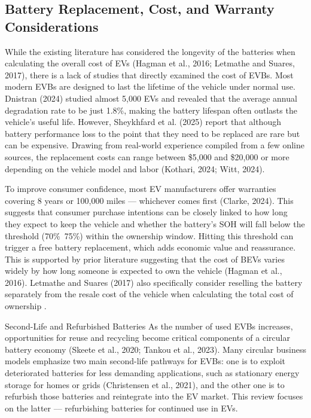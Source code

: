 \documentclass[a4paper,fleqn]{cas-sc}   %
\begin{document}
\subsection{Battery Replacement, Cost, and Warranty Considerations}
While the existing literature has considered the longevity of the batteries when calculating the overall cost of EVs (Hagman et al., 2016; Letmathe and Suares, 2017), there is a lack of studies that directly examined the cost of EVBs.
Most modern EVBs are designed to last the lifetime of the vehicle under normal use. Dnistran (2024) studied almost 5,000 EVs and revealed that the average annual degradation rate to be just 1.8\%, making the battery lifespan often outlasts the vehicle’s  useful life. However, Sheykhfard et al. (2025) report that although battery performance loss to the point that they need to be replaced are rare but can be expensive. Drawing from real-world experience compiled from a few online sources, the replacement costs can range between \$5,000 and \$20,000 or more depending on the vehicle model and labor (Kothari, 2024; Witt, 2024).

To improve consumer confidence, most EV manufacturers offer warranties covering 8 years or 100,000 miles –-- whichever comes first (Clarke, 2024). This suggests that consumer purchase intentions can be closely linked to how long they expect to keep the vehicle and whether the battery's SOH will fall below the threshold (70\%~75\%) within the ownership window. Hitting this threshold can trigger a free battery replacement, which adds economic value and reassurance. This is supported by prior literature suggesting that the cost of BEVs varies widely by how long someone is expected to own the vehicle (Hagman et al., 2016). Letmathe and Suares (2017) also specifically consider reselling the battery separately from the resale cost of the vehicle when calculating the total cost of ownership .

Second-Life and Refurbished Batteries
As the number of used EVBs increases, opportunities for reuse and recycling become critical components of a circular battery economy (Skeete et al., 2020; Tankou et al., 2023). Many circular business models emphasize two main second-life pathways for EVBs: one is to exploit deteriorated batteries for less demanding applications, such as stationary energy storage for homes or grids (Christensen et al., 2021), and the other one is to refurbish those batteries and reintegrate into the EV market. This review focuses on the latter --– refurbishing batteries for continued use in EVs.
\end{document}

